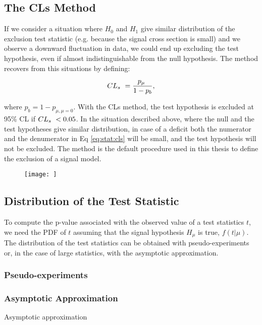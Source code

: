 \subsection{The CLs Method}

If we consider a situation where $H_0$ and $H_1$ give similar distribution of the exclusion test statistic (e.g. because the signal cross section is
small) and we observe a downward fluctuation in data, we could end up excluding the test hypothesis, even if almost indistinguishable from the null hypothesis. The \cls method \cite{JUNK1999435} recovers from this situations by defining:

\begin{equation}
\label{eq:stat:cls}
CL_s \  = \dfrac{p_\mu \ }{1 - p_b} , 
\end{equation}

\noindent where $p_b = 1 - p_{\mu, \mu=0}$. With the CLs method, the test hypothesis is excluded at 95\% CL if $CL_s \  < 0.05$. In the situation described above, where the null and the test hypotheses give similar \qmu distribution, in case of a deficit both the numerator and the denumerator in Eq \ref{eq:stat:cls} will be small, and the test hypothesis will not be excluded. The \cls method is the default procedure used in this thesis to define the exclusion of a signal model. 


\begin{figure}
\texttt{[image: ]}
\end{figure}

\subsection{Distribution of the Test Statistic}

To compute the p-value associated with the observed value of a test statistics $t$, we need the PDF of $t$ assuming that the signal hypothesis $H_\mu$ is true, $ f(t | \mu ) $. The distribution of the test statistics can be obtained with pseudo-experiments or, in the case of large statistics, with the asymptotic approximation. 

\subsubsection*{Pseudo-experiments}


\subsubsection*{Asymptotic Approximation}
Asymptotic approximation \cite{Cowan2011}

